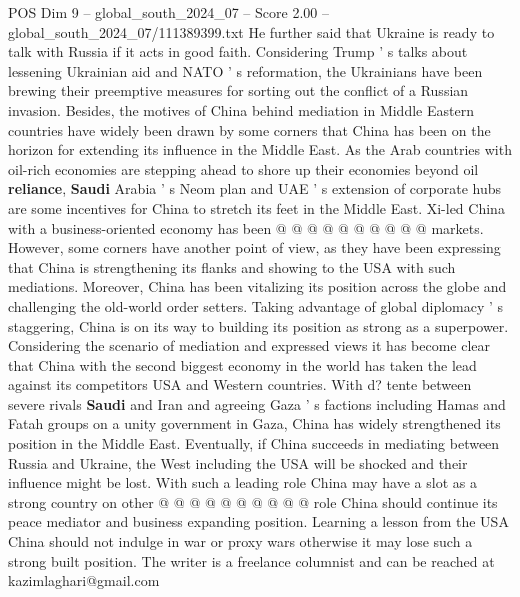 \begin{textsample}{POS Dim 9 – global\_south\_2024\_07 – Score 2.00 – global\_south\_2024\_07/111389399.txt}
He further said that Ukraine is ready to talk with Russia if it acts in good faith.
Considering Trump ' s talks about lessening Ukrainian aid and NATO ' s reformation, the Ukrainians have been brewing their preemptive measures for sorting out the conflict of a Russian invasion.
Besides, the motives of China behind mediation in Middle Eastern countries have widely been drawn by some corners that China has been on the horizon for extending its influence in the Middle East.
As the Arab countries with oil-rich economies are stepping ahead to shore up their economies beyond oil \textbf{reliance}, \textbf{Saudi} Arabia ' s Neom plan and UAE ' s extension of corporate hubs are some incentives for China to stretch its feet in the Middle East.
Xi-led China with a business-oriented economy has been @ @ @ @ @ @ @ @ @ @ markets.
However, some corners have another point of view, as they have been expressing that China is strengthening its flanks and showing to the USA with such mediations.
Moreover, China has been vitalizing its position across the globe and challenging the old-world order setters.
Taking advantage of global diplomacy ' s staggering, China is on its way to building its position as strong as a superpower.
Considering the scenario of mediation and expressed views it has become clear that China with the second biggest economy in the world has taken the lead against its competitors USA and Western countries.
With d? tente between severe rivals \textbf{Saudi} and Iran and agreeing Gaza ' s factions including Hamas and Fatah groups on a unity government in Gaza, China has widely strengthened its position in the Middle East.
Eventually, if China succeeds in mediating between Russia and Ukraine, the West including the USA will be shocked and their influence might be lost.
With such a leading role China may have a slot as a strong country on other @ @ @ @ @ @ @ @ @ @ role China should continue its peace mediator and business expanding position.
Learning a lesson from the USA China should not indulge in war or proxy wars otherwise it may lose such a strong built position.
The writer is a freelance columnist and can be reached at kazimlaghari@gmail.com

\end{textsample}
